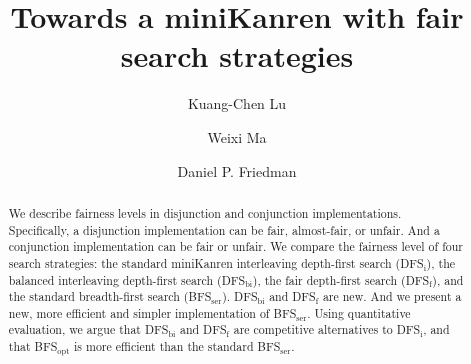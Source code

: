 \documentclass[format=acmlarge, review=true, authordraft=true]{acmart}
\title{Towards a miniKanren with fair search strategies}
\author{Kuang-Chen Lu}
\affiliation{Indiana University}
\author{Weixi Ma}
\affiliation{Indiana University}
\author{Daniel P. Friedman}
\affiliation{Indiana University}
\newcommand{\conde}{\texttt{cond$^e$}}
\newcommand{\conj}{\texttt{conj}}
\newcommand{\disj}{\texttt{disj}}
\newcommand{\DFSi }[0]{DFS$_\textrm{i}$}
\newcommand{\DFSf }[0]{DFS$_\textrm{f}$}
\newcommand{\DFSbi}[0]{DFS$_\textrm{bi}$}
\newcommand{\BFSopt}[0]{BFS$_\textrm{opt}$}
\newcommand{\BFSser}[0]{BFS$_\textrm{ser}$}
\begin{document}

\begin{abstract}

  We describe fairness levels in disjunction and conjunction
  implementations.  Specifically, a disjunction implementation can be
  fair, almost-fair, or unfair. And a conjunction implementation can
  be fair or unfair.  We compare the fairness level of four search
  strategies: the standard miniKanren interleaving depth-first search (\DFSi),
  the balanced interleaving depth-first search (\DFSbi), the fair depth-first
  search (\DFSf), and the standard breadth-first search (\BFSser).  
  \DFSbi{} and \DFSf{} are new. And we present a new, more efficient
  and simpler implementation of \BFSser. Using quantitative evaluation, 
  we argue that
  \DFSbi{} and \DFSf{} are competitive alternatives to \DFSi, 
  and that \BFSopt{} is more efficient than the standard \BFSser.

% 


\end{abstract}

\maketitle
\end{document}
